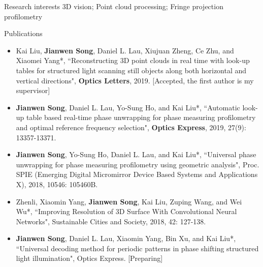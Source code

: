 \documentclass{resume} %
\begin{document}
\begin{rSection}{Research interests}
3D vision; Point cloud processing; Fringe projection profilometry
\end{rSection}
\begin{rSection}{Publications}

\begin{itemize}[leftmargin=*]
\item Kai Liu, {\bf Jianwen Song}, Daniel L. Lau, Xiujuan Zheng, Ce Zhu, and Xiaomei Yang*, ``Reconstructing 3D point clouds in real time with look-up tables for structured light scanning still objects along both horizontal and vertical directions", {\bf Optics Letters}, 2019. [Accepted, the first author is my supervisor]
\item {\bf Jianwen Song}, Daniel L. Lau, Yo-Sung Ho, and Kai Liu*, ``Automatic look-up table based real-time phase unwrapping for phase measuring profilometry and optimal reference frequency selection", {\bf Optics Express}, 2019, 27(9): 13357-13371.
\item {\bf Jianwen Song}, Yo-Sung Ho, Daniel L. Lau, and Kai Liu*, ``Universal phase unwrapping for phase measuring profilometry using geometric analysis", Proc. SPIE (Emerging Digital Micromirror Device Based Systems and Applications X), 2018, 10546: 105460B.
\item Zhenli, Xiaomin Yang, {\bf Jianwen Song}, Kai Liu, Zuping Wang, and Wei Wu*, ``Improving Resolution of 3D Surface With Convolutional Neural Networks", Sustainable Cities and Society, 2018, 42: 127-138.
\item {\bf Jianwen Song}, Daniel L. Lau, Xiaomin Yang, Bin Xu, and Kai Liu*, ``Universal decoding method for periodic patterns in phase shifting structured light illumination", Optics Express. [Preparing]
\end{itemize}
\end{rSection}
\end{document}
